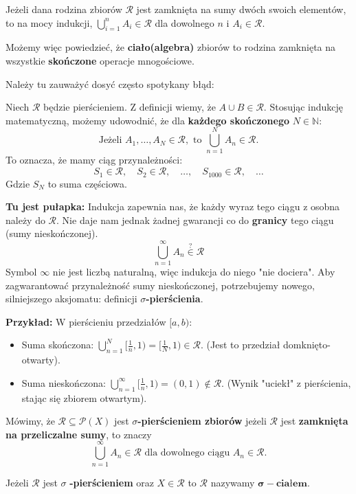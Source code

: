 	Jeżeli dana rodzina zbiorów $\mathcal{R}$ jest zamknięta na sumy dwóch swoich elementów, to na mocy indukcji, $\bigcup_{i=1} ^{n}A_{i}\in \mathcal{R}$ dla dowolnego $n$ i $A_{i}\in \mathcal{R}$.

	Możemy więc powiedzieć, że \textbf{ciało(algebra)} zbiorów to rodzina zamknięta na wszystkie \textbf{skończone} operacje mnogościowe.

	Należy tu zauważyć dosyć często spotykany błąd:
\begin{remark}[Granica Indukcji: Dlaczego $\forall n$ to nie to samo co $n=\infty$?]
    Niech $\mathcal{R}$ będzie pierścieniem. Z definicji wiemy, że $A \cup B \in \mathcal{R}$.
    Stosując indukcję matematyczną, możemy udowodnić, że dla \textbf{każdego skończonego} $N \in \mathbb{N}$:
    \[
        \text{Jeżeli } A_1, \dots, A_N \in \mathcal{R}, \text{ to } \bigcup_{n=1}^{N} A_n \in \mathcal{R}.
    \]
    To oznacza, że mamy ciąg przynależności:
    \[
        S_1 \in \mathcal{R}, \quad S_2 \in \mathcal{R}, \quad \dots, \quad S_{1000} \in \mathcal{R}, \quad \dots
    \]
    Gdzie $S_N$ to suma częściowa.
    
    \textbf{Tu jest pułapka:} Indukcja zapewnia nas, że każdy wyraz tego ciągu z osobna należy do $\mathcal{R}$. Nie daje nam jednak żadnej gwarancji co do \textbf{granicy} tego ciągu (sumy nieskończonej).
    \[
        \bigcup_{n=1}^{\infty} A_n \overset{?}{\in} \mathcal{R}
    \]
    Symbol $\infty$ nie jest liczbą naturalną, więc indukcja do niego "nie dociera". Aby zagwarantować przynależność sumy nieskończonej, potrzebujemy nowego, silniejszego aksjomatu: definicji \textbf{$\sigma$-pierścienia}.
    
    \textbf{Przykład:} W pierścieniu przedziałów $[a, b)$:
    \begin{itemize}
        \item Suma skończona: $\bigcup_{n=1}^N [\frac{1}{n}, 1) = [\frac{1}{N}, 1) \in \mathcal{R}$. (Jest to przedział domknięto-otwarty).
        \item Suma nieskończona: $\bigcup_{n=1}^\infty [\frac{1}{n}, 1) = (0, 1) \notin \mathcal{R}$. (Wynik "uciekł" z pierścienia, stając się zbiorem otwartym).
    \end{itemize}
\end{remark}
\begin{definition}

	Mówimy, że $\mathcal{R}\subseteq \mathcal{P}(X) $ jest \textbf{$\sigma$-pierścieniem zbiorów} jeżeli $\mathcal{R}$ jest \textbf{zamknięta na przeliczalne sumy}, to znaczy
	\[
		\bigcup_{n=1} ^{\infty}A_n \in \mathcal{R} \text{ dla dowolnego ciągu }A_n \in \mathcal{R}
	.\] 
	
	Jeżeli $\mathcal{R}$ jest $\sigma$ \textbf{-pierścieniem} oraz $X\in \mathcal{R}$ to $\mathcal{R}$ nazywamy $\bm{\sigma-\text{ciałem}}$.
\end{definition}


